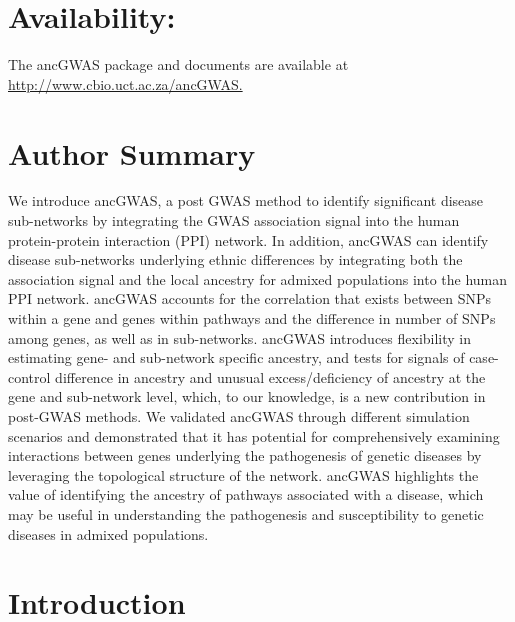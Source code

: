 \documentclass[10pt]{article}
\begin{document}
\vskip2mm
\section*{Availability:}
The ancGWAS package and documents are available at \url{http://www.cbio.uct.ac.za/ancGWAS.}
\vskip2mm
\section*{Author Summary}
We introduce ancGWAS, a post GWAS method to identify significant disease sub-networks by integrating the GWAS association signal into the human protein-protein interaction (PPI) network. In addition, ancGWAS can identify disease sub-networks underlying ethnic differences by integrating both the association signal and the local ancestry for admixed populations into the human PPI network. ancGWAS accounts for the correlation that exists between SNPs within a gene and genes within pathways and the difference in number of SNPs among genes, as well as in sub-networks. ancGWAS introduces flexibility in estimating gene- and sub-network specific ancestry, and tests for signals of case-control difference in ancestry and unusual excess/deficiency of ancestry at the gene and sub-network level, which, to our knowledge, is a new contribution in post-GWAS methods. We validated ancGWAS through different simulation scenarios and demonstrated that it has potential for comprehensively examining interactions between genes underlying the pathogenesis of genetic diseases by leveraging the topological structure of the network. ancGWAS  highlights the value of identifying the ancestry of pathways associated with a disease, which may be useful in understanding the pathogenesis and susceptibility to genetic diseases in admixed populations.
\vskip2mm

\section*{Introduction}
\end{document}
